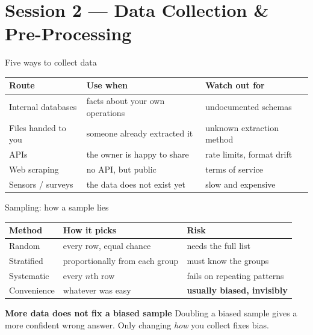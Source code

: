 \documentclass[10pt,aspectratio=169]{beamer}
\newcommand{\trapbox}[2]{%
  \begin{alertblock}{\textbf{#1}}
  #2
  \end{alertblock}%
}
\begin{document}
\section{Session 2 --- Data Collection \& Pre-Processing}

\begin{frame}{Five ways to collect data}
\begin{table}
\small
\begin{tabularx}{\linewidth}{@{}lXX@{}}
\toprule
\textbf{Route} & \textbf{Use when} & \textbf{Watch out for} \\
\midrule
Internal databases & facts about your own operations & undocumented schemas \\
Files handed to you & someone already extracted it & unknown extraction method \\
APIs & the owner is happy to share & rate limits, format drift \\
Web scraping & no API, but public & terms of service \\
Sensors / surveys & the data does not exist yet & slow and expensive \\
\bottomrule
\end{tabularx}
\end{table}
\end{frame}

\begin{frame}{Sampling: how a sample lies}
\begin{table}
\small
\begin{tabularx}{\linewidth}{@{}lXX@{}}
\toprule
\textbf{Method} & \textbf{How it picks} & \textbf{Risk} \\
\midrule
Random & every row, equal chance & needs the full list \\
Stratified & proportionally from each group & must know the groups \\
Systematic & every $n$th row & fails on repeating patterns \\
Convenience & whatever was easy & \textbf{usually biased, invisibly} \\
\bottomrule
\end{tabularx}
\end{table}
\vspace{0.3cm}
\trapbox{More data does not fix a biased sample}{Doubling a biased sample gives a more confident wrong answer. Only changing \emph{how} you collect fixes bias.}
\end{frame}
\end{document}
